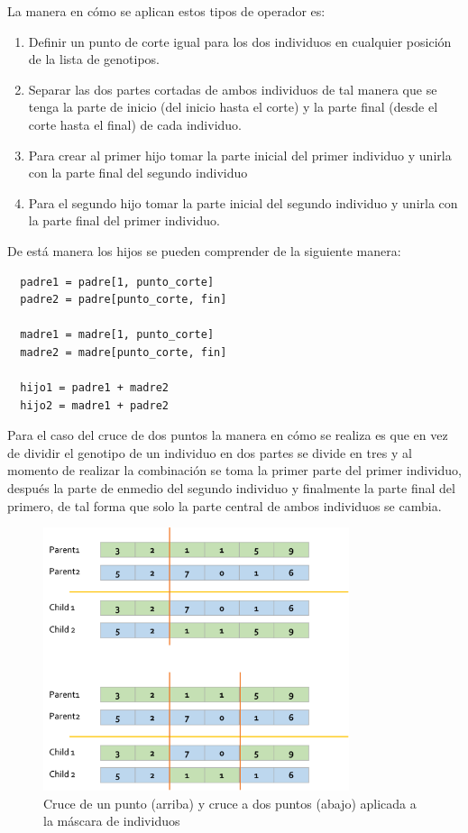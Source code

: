 La manera en cómo se aplican estos tipos de operador es:
\begin{enumerate}
  \item Definir un punto de corte igual para los dos individuos en cualquier
  posición de la lista de genotipos.
  \item Separar las dos partes cortadas de ambos individuos de tal manera que se
  tenga la parte de inicio (del inicio hasta el corte) y la parte final (desde
  el corte hasta el final) de cada individuo.
  \item Para crear al primer hijo tomar la parte inicial del primer individuo y
  unirla con la parte final del segundo individuo
  \item Para el segundo hijo tomar la parte inicial del segundo individuo y
  unirla con la parte final del primer individuo.
\end{enumerate}
De está manera los hijos se pueden comprender de la siguiente manera:
\begin{verbatim}
  padre1 = padre[1, punto_corte]
  padre2 = padre[punto_corte, fin]

  madre1 = madre[1, punto_corte]
  madre2 = madre[punto_corte, fin]

  hijo1 = padre1 + madre2
  hijo2 = madre1 + padre2
\end{verbatim}
Para el caso del cruce de dos puntos la manera en cómo se realiza es que en vez
de dividir el genotipo de un individuo en dos partes se divide en tres y al
momento de realizar la combinación se toma la primer parte del primer individuo,
después la parte de enmedio del segundo individuo y finalmente la parte final
del primero, de tal forma que solo la parte central de ambos individuos se
cambia.

\begin{figure}
  \centering
  \includegraphics[width=0.8\textwidth]{img/crossover.png}
  \caption{Cruce de un punto (arriba) y cruce a dos puntos (abajo) aplicada a la máscara de individuos}
  \label{figure:crossover}
\end{figure}

